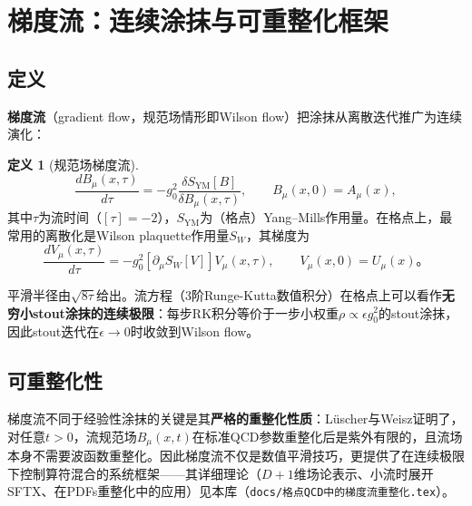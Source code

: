 \documentclass[12pt,a4paper]{ctexart}
\theoremstyle{definition}
\newtheorem{definition}{定义}[section]
\begin{document}
\section{梯度流：连续涂抹与可重整化框架}

\subsection{定义}

\textbf{梯度流}（gradient flow，规范场情形即Wilson flow）把涂抹从离散迭代推广为连续演化\cite{Luscher2010,LuscherWeisz2011}：

\begin{definition}[规范场梯度流]
\begin{equation}
\frac{dB_\mu(x, \tau)}{d\tau} = -g_0^2 \frac{\delta S_{\text{YM}}[B]}{\delta B_\mu(x, \tau)},
\qquad B_\mu(x, 0) = A_\mu(x),
\label{eq:wilson_flow}
\end{equation}
其中$\tau$为流时间（$[\tau] = -2$），$S_{\text{YM}}$为（格点）Yang--Mills作用量。在格点上，最常用的离散化是Wilson plaquette作用量$S_W$，其梯度为
\begin{equation}
\frac{dV_\mu(x,\tau)}{d\tau} = -g_0^2 \left[ \partial_{\mu} S_W[V] \right] V_\mu(x,\tau),
\qquad V_\mu(x,0) = U_\mu(x)。
\label{eq:wilson_flow_lattice}
\end{equation}
\end{definition}

平滑半径由$\sqrt{8\tau}$给出。流方程（3阶Runge-Kutta数值积分）在格点上可以看作\textbf{无穷小stout涂抹的连续极限}：每步RK积分等价于一步小权重$\rho \propto \epsilon g_0^2$的stout涂抹，因此stout迭代在$\epsilon \to 0$时收敛到Wilson flow\cite{Luscher2010}。

\subsection{可重整化性}

梯度流不同于经验性涂抹的关键是其\textbf{严格的重整化性质}：L\"uscher与Weisz证明了，对任意$t>0$，流规范场$B_\mu(x,t)$在标准QCD参数重整化后是紫外有限的，且流场本身不需要波函数重整化\cite{LuscherWeisz2011}。因此梯度流不仅是数值平滑技巧，更提供了在连续极限下控制算符混合的系统框架——其详细理论（$D+1$维场论表示、小流时展开SFTX、在PDFs重整化中的应用）见本库\cite{GradientFlowDoc}（\texttt{docs/格点QCD中的梯度流重整化.tex}）。

\end{document}
